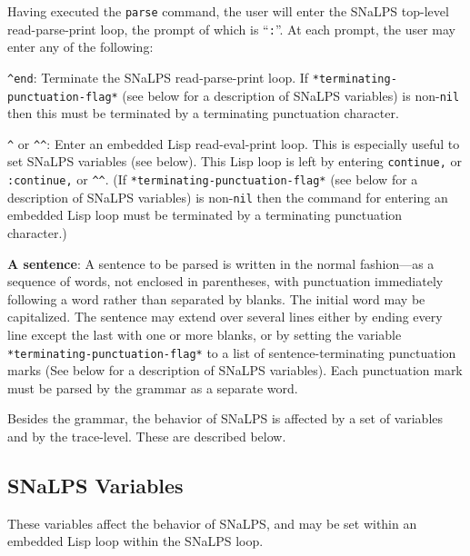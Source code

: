 \documentclass{book}
\begin{document}
Having executed the {\tt parse} command, the user will enter the SNaLPS top-level read-parse-print
loop, the prompt of which is ``{\tt :}''.  At each prompt, the user may enter any of the following:
\begin{description}
\item{\verb|^end|:} Terminate the SNaLPS read-parse-print loop. If \verb|*terminating-punctuation-flag*|
(see below for a description of SNaLPS variables)
is non-{\tt nil} then this must be terminated by a terminating punctuation character.

\item{\verb|^| or \verb|^^|:} Enter an embedded Lisp read-eval-print loop.  This is especially useful to
set SNaLPS variables (see below).  This Lisp loop is left by entering {\tt continue,} or {\tt
:continue,} or \verb|^^|.  (If \verb|*terminating-punctuation-flag*| (see below for a description of
SNaLPS variables) is non-{\tt nil} then the command for entering an embedded Lisp loop must be
terminated by a terminating punctuation character.)

\item{{\bf A sentence}:} A sentence to be parsed is written in the normal fashion---as a sequence of
words, not enclosed in parentheses, with punctuation immediately following a word rather than
separated by blanks.  The initial word may be capitalized.  The sentence may extend over several
lines either by ending every line except the last with one or more blanks, or by setting the
variable \verb|*terminating-punctuation-flag*| to a list of sentence-terminating punctuation
marks (See below for a description of SNaLPS variables).  Each punctuation mark must be parsed by
the grammar as a separate word.

\end{description}

Besides the grammar, the behavior of SNaLPS is affected by a set of variables and by the
trace-level.  These are described below.

\subsection{SNaLPS Variables}

These variables affect the behavior of SNaLPS, and may be set within an embedded Lisp loop within
the SNaLPS loop.
\end{document}
